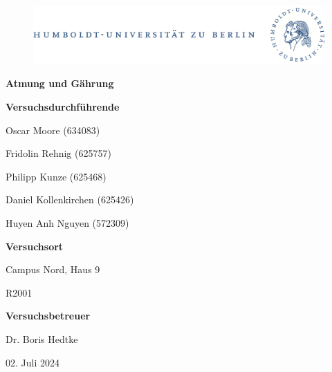 \documentclass[10pt,a4paper]{article}
\begin{document}
	
	\begin{titlepage}
		\begin{center}
			\begin{figure}[h!tbp]
				\includegraphics[width=\linewidth]{HUlogo.PNG}
			\end{figure}
			\vspace*{2 cm}
			
			\textcolor{Bluetitle}{\textbf{\huge Atmung und Gährung}}\par
			
			\vspace*{2cm}
			
			\textcolor{Greyish}{\textbf{Versuchsdurchführende}}\par
			\textcolor{Greyish}{Oscar Moore (634083)}\par
			\textcolor{Greyish}{Fridolin Rehnig (625757)}\par
			\textcolor{Greyish}{Philipp Kunze (625468)}\par
			\textcolor{Greyish}{Daniel Kollenkirchen (625426)}\par
			\textcolor{Greyish}{Huyen Anh Nguyen (572309)}\par
			
			\vspace*{0.5cm}
			\textcolor{Greyish}{\textbf{Versuchsort}}\par
			\textcolor{Greyish}{Campus Nord, Haus 9}\par
			\textcolor{Greyish}{R2001}\par
			\vspace*{0.5cm}
			\textcolor{Greyish}{\textbf{Versuchsbetreuer}}\par
			\textcolor{Greyish}{Dr. Boris Hedtke}\par
			
			\vspace*{2 cm}
			
			\textcolor{Greyish}{02. Juli 2024}\par
			
			
			
			
		\end{center}
	\end{titlepage}
	
	\tableofcontents
	
\end{document}
